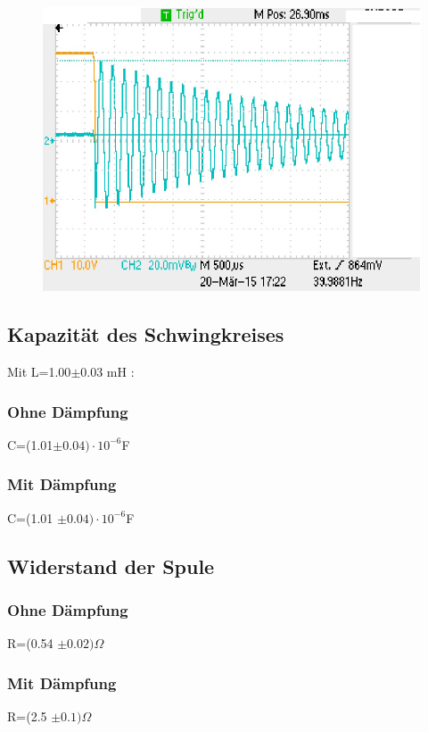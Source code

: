 \documentclass{article}
\begin{document}
\begin{figure}
\begin{subfigure}{0.5\textwidth}
\end{subfigure}
\end{figure}
\begin{center}
\begin{figure}
\includegraphics[width=0.5\linewidth]{freieschw.eps}
\end{figure}
\end{center}
\subsection*{Kapazität des Schwingkreises}
\label{Kapa}
Mit L=1.00$\pm$0.03 mH :\\
\subsubsection*{Ohne Dämpfung} 
\begin{center}C=(1.01$ \pm 0.04) \cdot 10^{-6}$F \end{center}
\subsubsection*{Mit Dämpfung}  
\begin{center}C=(1.01 $ \pm 0.04) \cdot 10^{-6}$F \end{center} 

\subsection*{Widerstand der Spule}


\subsubsection*{Ohne Dämpfung}
R=(0.54 $\pm0.02) \Omega$\\

\subsubsection*{Mit Dämpfung} 
R=(2.5 $\pm 0.1) \Omega$ \\
\end{document}
